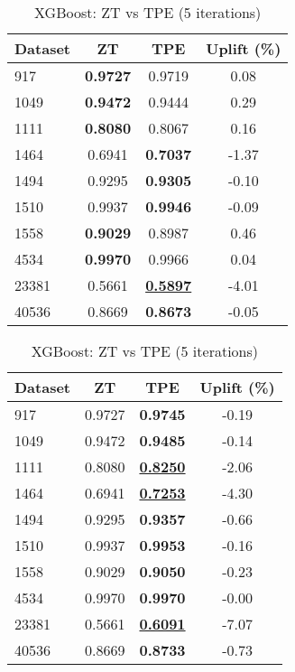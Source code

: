 \begin{table}[htbp]
\begin{center}
\begin{small}
\begin{sc}
\begin{subtable}[t]{0.48\textwidth}
    \centering
    \caption{XGBoost: ZT vs TPE (1 iteration)}
    \label{tab:xgboost-zt-vs-tpe-1}
    \begin{tabular}{lccc}
    \toprule
    \textbf{Dataset} & \textbf{ZT} & \textbf{TPE} & \textbf{Uplift (\%)} \\
    \midrule
    917    & \textbf{0.9727} & 0.9719 & 0.08 \\
    1049    & \textbf{0.9472} & 0.9444 & 0.29 \\
    1111    & \textbf{0.8080} & 0.8067 & 0.16 \\
    1464    & 0.6941 & \textbf{0.7037} & -1.37 \\
    1494    & 0.9295 & \textbf{0.9305} & -0.10 \\
    1510    & 0.9937 & \textbf{0.9946} & -0.09 \\
    1558    & \textbf{0.9029} & 0.8987 & 0.46 \\
    4534    & \textbf{0.9970} & 0.9966 & 0.04 \\
    23381    & 0.5661 & \underline{\textbf{0.5897}} & -4.01 \\
    40536    & 0.8669 & \textbf{0.8673} & -0.05 \\
    \bottomrule
    \end{tabular}
\end{subtable}
\hfill
\begin{subtable}[t]{0.48\textwidth}
    \centering
    \caption{XGBoost: ZT vs TPE (5 iterations)}
    \label{tab:xgboost-zt-vs-tpe-5}
    \begin{tabular}{lccc}
    \toprule
    \textbf{Dataset} & \textbf{ZT} & \textbf{TPE} & \textbf{Uplift (\%)} \\
    \midrule
    917    & 0.9727 & \textbf{0.9745} & -0.19 \\
    1049    & 0.9472 & \textbf{0.9485} & -0.14 \\
    1111    & 0.8080 & \underline{\textbf{0.8250}} & -2.06 \\
    1464    & 0.6941 & \underline{\textbf{0.7253}} & -4.30 \\
    1494    & 0.9295 & \textbf{0.9357} & -0.66 \\
    1510    & 0.9937 & \textbf{0.9953} & -0.16 \\
    1558    & 0.9029 & \textbf{0.9050} & -0.23 \\
    4534    & 0.9970 & \textbf{0.9970} & -0.00 \\
    23381    & 0.5661 & \underline{\textbf{0.6091}} & -7.07 \\
    40536    & 0.8669 & \textbf{0.8733} & -0.73 \\
    \bottomrule
    \end{tabular}
\end{subtable}


\end{sc}
\end{small}
\end{center}
\end{table}
